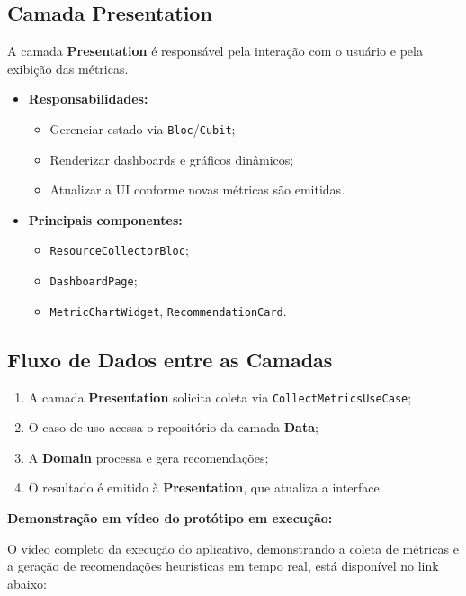 \documentclass[12pt,a4paper,oneside]{abntex2}
\begin{document}
\subsection{Camada Presentation}

A camada \textbf{Presentation} é responsável pela interação com o usuário e pela exibição das métricas.

\begin{itemize}
  \item \textbf{Responsabilidades:}
    \begin{itemize}
      \item Gerenciar estado via \texttt{Bloc}/\texttt{Cubit};
      \item Renderizar dashboards e gráficos dinâmicos;
      \item Atualizar a UI conforme novas métricas são emitidas.
    \end{itemize}
  \item \textbf{Principais componentes:}
    \begin{itemize}
      \item \texttt{ResourceCollectorBloc};
      \item \texttt{DashboardPage};
      \item \texttt{MetricChartWidget}, \texttt{RecommendationCard}.
    \end{itemize}
\end{itemize}

\subsection{Fluxo de Dados entre as Camadas}

\begin{enumerate}
  \item A camada \textbf{Presentation} solicita coleta via \texttt{CollectMetricsUseCase};
  \item O caso de uso acessa o repositório da camada \textbf{Data};
  \item A \textbf{Domain} processa e gera recomendações;
  \item O resultado é emitido à \textbf{Presentation}, que atualiza a interface.
\end{enumerate}

\vspace{0.5cm}
\noindent
\textbf{Demonstração em vídeo do protótipo em execução:}


\vspace{0.4cm}
\noindent
O vídeo completo da execução do aplicativo, demonstrando a coleta de métricas e a geração de recomendações heurísticas em tempo real, está disponível no link abaixo:
\end{document}
